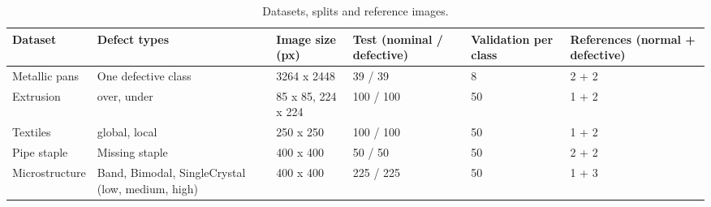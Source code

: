 \begin{table}

\caption{\label{tab:tbl-datasets}Datasets, splits and reference images.}
\centering
\begin{tabular}[t]{llllll}
\toprule
Dataset & Defect types & Image size (px) & Test (nominal / defective) & Validation per class & References (normal + defective)\\
\midrule
Metallic pans & One defective class & 3264 x 2448 & 39 / 39 & 8 & 2 + 2\\
Extrusion & over, under & 85 x 85, 224 x 224 & 100 / 100 & 50 & 1 + 2\\
Textiles & global, local & 250 x 250 & 100 / 100 & 50 & 1 + 2\\
Pipe staple & Missing staple & 400 x 400 & 50 / 50 & 50 & 2 + 2\\
Microstructure & Band, Bimodal, SingleCrystal (low, medium, high) & 400 x 400 & 225 / 225 & 50 & 1 + 3\\
\bottomrule
\end{tabular}
\end{table}
